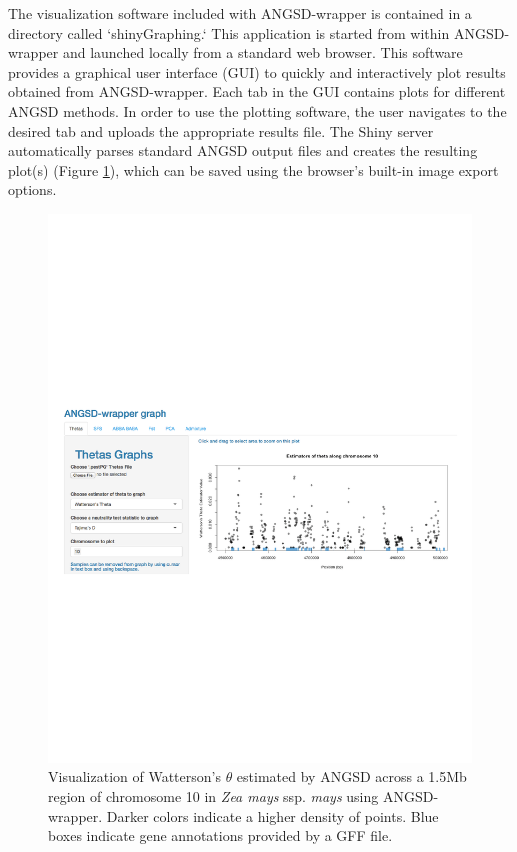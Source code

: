 \documentclass[10pt,a4paper]{article}
\begin{document}
The visualization software included with ANGSD-wrapper is contained in a directory called `shinyGraphing.`
This application is started from within ANGSD-wrapper and launched locally from a standard web browser. 
This software provides a graphical user interface (GUI) to quickly and interactively plot results obtained from ANGSD-wrapper.  
Each tab in the GUI contains plots for different ANGSD methods.
In order to use the plotting software, the user navigates to the desired tab and uploads the appropriate results file. 
The Shiny server automatically parses standard ANGSD output files and creates the resulting plot(s) (Figure \ref{fig:theta}), which can be saved using the browser's built-in image export options.

\begin{figure}
\centering
\caption{Visualization of Watterson's $\theta$ estimated by ANGSD across a 1.5Mb region of chromosome 10 in {\it Zea mays} ssp. {\it mays} using ANGSD-wrapper. Darker colors indicate a higher density of points. Blue boxes indicate gene annotations provided by a GFF file. \label{fig:theta} }
\includegraphics[width=0.8\linewidth]{figures/fig1.pdf}
\end{figure}
\end{document}
